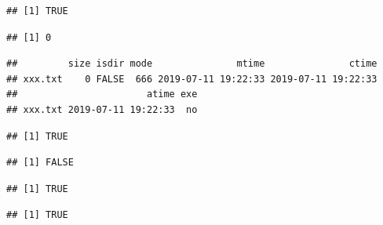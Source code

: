 \documentclass[krantz2]{krantz}\usepackage{knitr}%
\begin{document}
\begin{knitrout}\footnotesize
{}\color{fgcolor}\begin{kframe}
\begin{alltt}
 \hlstd{(}\hlopt{!}\hlstd{(}\hlstd{)) \{}
  \hlstd{(}\hlstd{)}
\hlstd{\}}
\end{alltt}
\begin{verbatim}
## [1] TRUE
\end{verbatim}
\begin{alltt}
\hlstd{(}\hlstd{)}
\end{alltt}
\begin{verbatim}
## [1] 0
\end{verbatim}
\begin{alltt}
\hlstd{(}\hlstd{)}
\end{alltt}
\begin{verbatim}
##         size isdir mode               mtime               ctime
## xxx.txt    0 FALSE  666 2019-07-11 19:22:33 2019-07-11 19:22:33
##                       atime exe
## xxx.txt 2019-07-11 19:22:33  no
\end{verbatim}
\begin{alltt}
\hlstd{(}\hlstd{,} \hlstd{)}
\end{alltt}
\begin{verbatim}
## [1] TRUE
\end{verbatim}
\begin{alltt}
\hlstd{(}\hlstd{)}
\end{alltt}
\begin{verbatim}
## [1] FALSE
\end{verbatim}
\begin{alltt}
\hlstd{(}\hlstd{)}
\end{alltt}
\begin{verbatim}
## [1] TRUE
\end{verbatim}
\begin{alltt}
\hlstd{(}\hlstd{)}
\end{alltt}
\begin{verbatim}
## [1] TRUE
\end{verbatim}
\end{kframe}
\end{knitrout}
\end{document}
